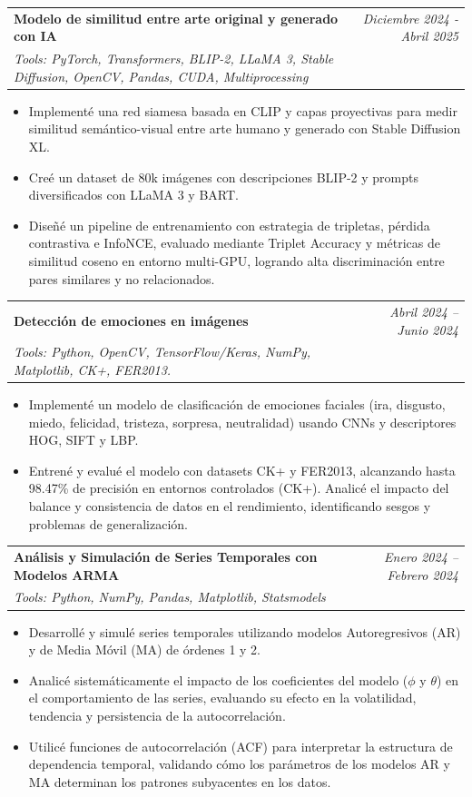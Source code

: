 \documentclass[a4paper,11pt]{article}
\makeatletter
\newcommand{\resumeProject}[4]{
\vspace{0.5mm}\item
    \begin{tabular*}{0.98\textwidth}[t]{l@{\extracolsep{\fill}}r}
        \textbf{#1} & \textit{\footnotesize{#3}} \\
        \footnotesize{\textit{#2}} & \footnotesize{#4}
    \end{tabular*}
    \vspace{-2.4mm}
}
\newcommand{\resumeItemListStart}{\begin{itemize}[leftmargin=*,labelsep=1mm,itemsep=0.5mm]\footnotesize}
\newcommand{\resumeItemListEnd}{\end{itemize}\vspace{-2mm}}
\makeatother
\begin{document}
\resumeProject
  {Modelo de similitud entre arte original y generado con IA}
  {Tools: PyTorch, Transformers, BLIP-2, LLaMA 3, Stable Diffusion, OpenCV, Pandas, CUDA, Multiprocessing}
  {Diciembre 2024 - Abril 2025}
  {{}\href{https://github.com/DiegoCastr00/CalculoSimilitud/tree/master}{\textcolor{darkblue}{\faGithub}}}
\resumeItemListStart
  \item Implementé una red siamesa basada en CLIP y capas proyectivas para medir similitud semántico-visual entre arte humano y generado con Stable Diffusion XL.
  \item Creé un dataset de 80k imágenes con descripciones BLIP-2 y prompts diversificados con LLaMA 3 y BART.
  \item Diseñé un pipeline de entrenamiento con estrategia de tripletas, pérdida contrastiva e InfoNCE, evaluado mediante Triplet Accuracy y métricas de similitud coseno en entorno multi-GPU, logrando alta discriminación entre pares similares y no relacionados.
\resumeItemListEnd

\resumeProject
  {Detección de emociones en imágenes}
  {Tools: Python, OpenCV, TensorFlow/Keras, NumPy, Matplotlib, CK+, FER2013.}
  {Abril 2024 – Junio 2024}
  {{}\href{https://github.com/DiegoCastr00/DeteccionEmociones}{\textcolor{darkblue}{\faGithub}}}
\resumeItemListStart
  \item Implementé un modelo de clasificación de emociones faciales (ira, disgusto, miedo, felicidad, tristeza, sorpresa, neutralidad) usando CNNs y descriptores HOG, SIFT y LBP.
  \item Entrené y evalué el modelo con datasets CK+ y FER2013, alcanzando hasta 98.47\% de precisión en entornos controlados (CK+). Analicé el impacto del balance y consistencia de datos en el rendimiento, identificando sesgos y problemas de generalización.
\resumeItemListEnd

\resumeProject
  {Análisis y Simulación de Series Temporales con Modelos ARMA}
  {Tools: Python, NumPy, Pandas, Matplotlib, Statsmodels}
  {Enero 2024 – Febrero 2024}
  {{}\href{https://github.com/DiegoCastr00/Machine_Learning/blob/master/Practica_9_ARMA/ARMA.ipynb}{\textcolor{darkblue}{\faGithub}}}
\resumeItemListStart
  \item Desarrollé y simulé series temporales utilizando modelos Autoregresivos (AR) y de Media Móvil (MA) de órdenes 1 y 2.
  \item Analicé sistemáticamente el impacto de los coeficientes del modelo ($\phi$ y $\theta$) en el comportamiento de las series, evaluando su efecto en la volatilidad, tendencia y persistencia de la autocorrelación.
  \item Utilicé funciones de autocorrelación (ACF) para interpretar la estructura de dependencia temporal, validando cómo los parámetros de los modelos AR y MA determinan los patrones subyacentes en los datos.
\resumeItemListEnd
\end{document}
